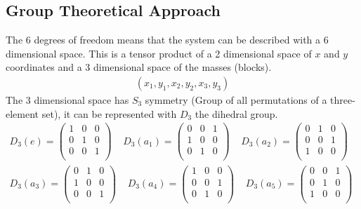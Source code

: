 \documentclass[a4paper]{article}
\theoremstyle{definition}
\theoremstyle{definition}
\theoremstyle{definition}
\theoremstyle{theorem}
\theoremstyle{theorem}
\theoremstyle{definition}
\begin{document}
\subsection{Group Theoretical Approach}
The 6 degrees of freedom means that the system can be described with a 6 dimensional space.
This is a tensor product of a 2 dimensional space of $x$ and $y$ coordinates and a 3 dimensional
space of the masses (blocks).
\begin{align}
    (x_1, y_1, x_2, y_2,x_3, y_3)
\end{align}
The 3 dimensional space has $S_3$ symmetry (Group of all permutations of a three-element set),
it can be represented with $D_3$ the dihedral group.
\begin{align}
    D_3(e) =
    \begin{pmatrix}
        1 & 0 & 0 \\
        0 & 1 & 0 \\
        0 & 0 & 1 \\
    \end{pmatrix} \;\;\;\;
    D_3(a_1) = \begin{pmatrix}
        0 & 0 & 1 \\
        1 & 0 & 0 \\
        0 & 1 & 0 \\
    \end{pmatrix} \;\;\;\;
    D_3(a_2) =
    \begin{pmatrix}
        0 & 1 & 0 \\
        0 & 0 & 1 \\
        1 & 0 & 0 \\
    \end{pmatrix} \;\;\;\; \\
    D_3(a_3) =
    \begin{pmatrix}
        0 & 1 & 0 \\
        1 & 0 & 0 \\
        0 & 0 & 1 \\
    \end{pmatrix} \;\;\;\;
    D_3(a_4) = \begin{pmatrix}
        1 & 0 & 0 \\
        0 & 0 & 1 \\
        0 & 1 & 0 \\
    \end{pmatrix} \;\;\;\;
    D_3(a_5) =
    \begin{pmatrix}
        0 & 0 & 1 \\
        0 & 1 & 0 \\
        1 & 0 & 0 \\
    \end{pmatrix} \;\;\;\;
\end{align}
\end{document}
